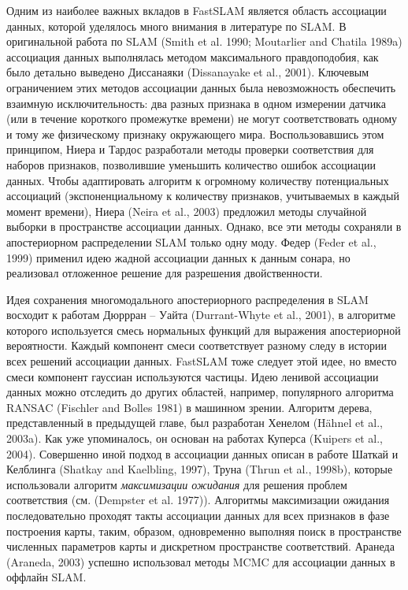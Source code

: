 \documentclass[10pt,a4paper]{article}
\begin{document}
Одним из наиболее важных вкладов в FastSLAM является область ассоциации данных, которой уделялось много внимания в литературе по SLAM. В оригинальной работа по SLAM (Smith et al. 1990; Moutarlier and Chatila 1989a)  ассоциация данных выполнялась методом максимального правдоподобия, как было детально выведено Диссанаяки (Dissanayake et al., 2001). Ключевым ограничением этих методов ассоциации данных была невозможность обеспечить взаимную исключительность: два разных признака в одном измерении датчика (или в течение короткого промежутке времени) не могут соответствовать одному и тому же физическому признаку окружающего мира. Воспользовавшись этом принципом, Ниера и Тардос разработали методы проверки соответствия для наборов признаков, позволившие уменьшить количество ошибок ассоциации данных. Чтобы адаптировать алгоритм к огромному количеству потенциальных ассоциаций (экспоненциальному к количеству признаков, учитываемых в каждый момент времени), Ниера (Neira et al., 2003) предложил методы случайной выборки в пространстве ассоциации данных. Однако, все эти методы сохраняли в апостериорном распределении SLAM только одну моду. Федер (Feder et al., 1999) применил идею жадной ассоциации данных к данным сонара, но реализовал отложенное решение для разрешения двойственности.

Идея сохранения многомодального апостериорного распределения в SLAM восходит к работам Дюррран – Уайта (Durrant-Whyte et al., 2001), в алгоритме которого используется смесь нормальных функций для выражения апостериорной вероятности. Каждый компонент смеси соответствует разному следу в истории всех решений ассоциации данных. FastSLAM тоже следует этой идее, но вместо смеси компонент гауссиан используются частицы. Идею ленивой ассоциации данных можно отследить до других областей, например, популярного алгоритма RANSAC (Fischler and Bolles 1981) в машинном зрении. Алгоритм дерева, представленный в предыдущей главе, был разработан Хенелом (Hähnel et al., 2003a). Как уже упоминалось, он основан на работах Куперса (Kuipers et al., 2004). Совершенно иной подход в ассоциации данных описан в работе Шаткай и Келблинга (Shatkay and Kaelbling, 1997), Труна (Thrun et al., 1998b), которые использовали алгоритм \textit{максимизации ожидания} для решения проблем соответствия (см. (Dempster et al. 1977)). Алгоритмы максимизации ожидания последовательно проходят такты ассоциации данных для всех признаков в фазе построения карты, таким, образом, одновременно выполняя поиск в пространстве численных параметров карты и дискретном пространстве соответствий. Аранеда (Araneda, 2003) успешно использовал методы MCMC для ассоциации данных в оффлайн SLAM.
\end{document}
